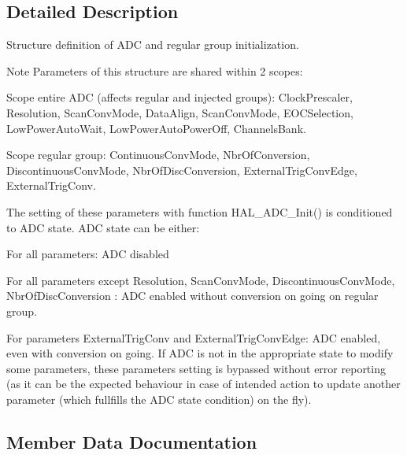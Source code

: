 \subsection{Detailed Description}
Structure definition of A\+DC and regular group initialization. 

\begin{DoxyNote}{Note}
Parameters of this structure are shared within 2 scopes\+:
\begin{DoxyItemize}
\item Scope entire A\+DC (affects regular and injected groups)\+: Clock\+Prescaler, Resolution, Scan\+Conv\+Mode, Data\+Align, Scan\+Conv\+Mode, E\+O\+C\+Selection, Low\+Power\+Auto\+Wait, Low\+Power\+Auto\+Power\+Off, Channels\+Bank.
\item Scope regular group\+: Continuous\+Conv\+Mode, Nbr\+Of\+Conversion, Discontinuous\+Conv\+Mode, Nbr\+Of\+Disc\+Conversion, External\+Trig\+Conv\+Edge, External\+Trig\+Conv. 
\end{DoxyItemize}

The setting of these parameters with function H\+A\+L\+\_\+\+A\+D\+C\+\_\+\+Init() is conditioned to A\+DC state. A\+DC state can be either\+:
\begin{DoxyItemize}
\item For all parameters\+: A\+DC disabled
\item For all parameters except \textquotesingle{}Resolution\textquotesingle{}, \textquotesingle{}Scan\+Conv\+Mode\textquotesingle{}, \textquotesingle{}Discontinuous\+Conv\+Mode\textquotesingle{}, \textquotesingle{}Nbr\+Of\+Disc\+Conversion\textquotesingle{} \+: A\+DC enabled without conversion on going on regular group.
\item For parameters \textquotesingle{}External\+Trig\+Conv\textquotesingle{} and \textquotesingle{}External\+Trig\+Conv\+Edge\textquotesingle{}\+: A\+DC enabled, even with conversion on going. If A\+DC is not in the appropriate state to modify some parameters, these parameters setting is bypassed without error reporting (as it can be the expected behaviour in case of intended action to update another parameter (which fullfills the A\+DC state condition) on the fly). 
\end{DoxyItemize}
\end{DoxyNote}


\subsection{Member Data Documentation}
\mbox{\label{struct_a_d_c___init_type_def_a7e49d0db9ef7db8806bbfa57a1bd73a6}} 
